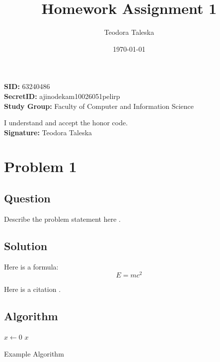 \documentclass[a4paper,11pt]{article}
\begin{document}
\title{Homework Assignment 1}
\author{Teodora Taleska}
\date{\today}
\maketitle

\vfill
\begin{flushleft}
    \textbf{SID:} 63240486\\
    \textbf{SecretID:} ajinodekam10026051pelirp\\
    \textbf{Study Group:} Faculty of Computer and Information Science\\
\end{flushleft}

\vspace{1cm}

\begin{flushright}
    I understand and accept the honor code.\\[0.5cm]
    \textbf{Signature:} Teodora Taleska\\
\end{flushright}

\newpage



\section*{Problem 1}
\subsection*{Question}
Describe the problem statement here \cite{qu2023towards}.

\subsection*{Solution}
Here is a formula:
\begin{equation}
    E = mc^2
\end{equation}

Here is a citation \cite{somebook}.

\subsection*{Algorithm}
\begin{algorithm}[H]
\DontPrintSemicolon
\SetAlgoLined
{}
$x \gets 0$\;
\Return $x$\;
\caption{Example Algorithm}
\end{algorithm}
\end{document}
